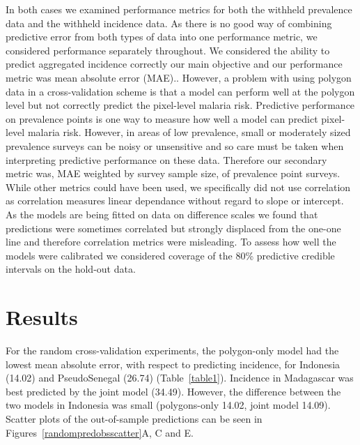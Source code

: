 \documentclass[10pt,letterpaper]{article}
\begin{document}
In both cases we examined performance metrics for both the withheld prevalence data and the withheld incidence data.
As there is no good way of combining predictive error from both types of data into one performance metric, we considered performance separately throughout.
We considered the ability to predict aggregated incidence correctly our main objective and our performance metric was mean absolute error (MAE)..
However, a problem with using polygon data in a cross-validation scheme is that a model can perform well at the polygon level but not correctly predict the pixel-level malaria risk.
Predictive performance on prevalence points is one way to measure how well a model can predict pixel-level malaria risk.
However, in areas of low prevalence, small or moderately sized prevalence surveys can be noisy or unsensitive and so care must be taken when interpreting predictive performance on these data.
Therefore our secondary metric was, MAE weighted by survey sample size, of prevalence point surveys.
While other metrics could have been used, we specifically did not use correlation as correlation measures linear dependance without regard to slope or intercept.
As the models are being fitted on data on difference scales we found that predictions were sometimes correlated but strongly displaced from the one-one line and therefore correlation metrics were misleading.
To assess how well the models were calibrated we considered coverage of the 80\% predictive credible intervals on the hold-out data.



\section*{Results}



For the random cross-validation experiments, the polygon-only model had the lowest mean absolute error, with respect to predicting incidence, for Indonesia (14.02) and PseudoSenegal (26.74) (Table~\ref{table1}).
Incidence in Madagascar was best predicted by the joint model (34.49).
However, the difference between the two models in Indonesia was small (polygons-only 14.02, joint model 14.09).
Scatter plots of the out-of-sample predictions can be seen in Figures~\ref{randompredobsscatter}A, C and E.
\end{document}
